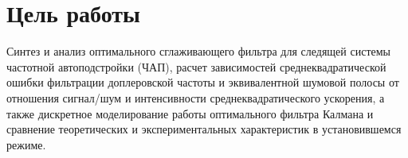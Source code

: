\section{Цель работы}
Синтез и анализ оптимального сглаживающего фильтра для следящей системы частотной автоподстройки (ЧАП), расчет зависимостей среднеквадратической ошибки фильтрации доплеровской частоты и эквивалентной шумовой полосы от отношения сигнал/шум и интенсивности среднеквадратического ускорения, а также дискретное моделирование работы оптимального фильтра Калмана и сравнение теоретических и экспериментальных характеристик в установившемся режиме.

